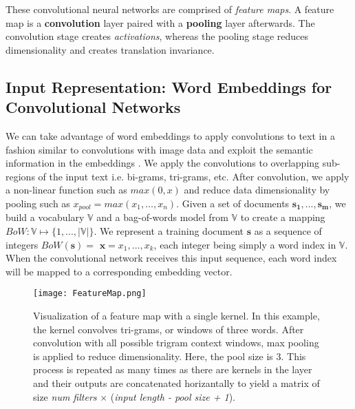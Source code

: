 These convolutional neural networks are comprised of \textit{feature maps}. A feature map is a \textbf{convolution} layer paired with a
\textbf{pooling} layer afterwards. The convolution stage creates \textit{activations}, whereas the pooling stage
reduces dimensionality and creates translation invariance.


\subsection{Input Representation: Word Embeddings for Convolutional Networks}
We can take advantage of word embeddings to apply convolutions to text in a fashion similar to convolutions with
image data and exploit the semantic information in the embeddings \cite{kim2014convolutional}. We apply the convolutions to overlapping sub-regions of the input text i.e. bi-grams, tri-grams, etc.
After convolution, we apply a non-linear function such as $max(0,x)$ and reduce data dimensionality
by pooling such as $x_{pool} = max(x_1,\dots,x_n)$.
Given a set of documents $\bm{s_1},...,\bm{s_m}$, we build a vocabulary $\mathbb{V}$ and a bag-of-words model from $\mathbb{V}$ to create a mapping $BoW:\mathbb{V} \mapsto \{1,...,|\mathbb{V}|\}$.
We represent a training document $\bm{s}$ as a sequence of integers $BoW(\bm{s})=$ $\bm{x} = x_1,...,x_k$, each integer being simply a word index
in $\mathbb{V}$. When the convolutional network receives this input sequence, each word index will be mapped to a corresponding embedding vector.

\begin{figure}[H]
\caption{Visualization of a feature map with a single kernel. In this example, the kernel convolves tri-grams, or windows of three words.
After convolution with all possible trigram context windows, max pooling is applied to reduce dimensionality.
Here, the pool size is 3. This process is repeated as many times as there are kernels in the layer and their outputs are
concatenated horizantally to yield a matrix of size \textit{num filters} $\times$ (\textit{input length - pool size + 1}).}
\centering
\texttt{[image: FeatureMap.png]}
\label{fig:convolution}
\end{figure}
